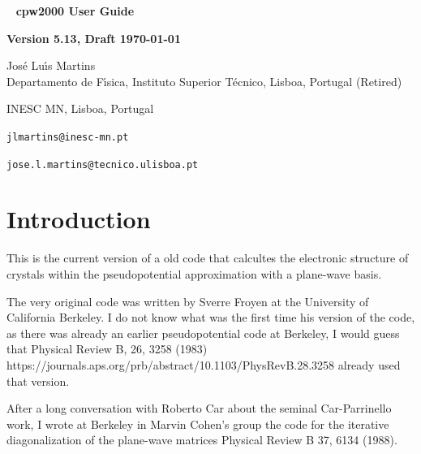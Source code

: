 \documentclass[11pt]{article}
\begin{document}

\begin{titlepage}

\begin{center}
~
\vfill
\vspace{1cm}
{\Huge {\bf cpw2000 User Guide}}
\par\vspace{3cm}
\hrulefill
\par\vspace{3cm}
{\Large {\bf Version 5.13, Draft \today}}
\par\vspace{2cm}
\hrulefill

{\Large Jos\'e Lu\'{\i}s Martins \\
Departamento de F\'{\i}sica, Instituto Superior T\'ecnico, Lisboa, Portugal (Retired)

INESC MN, Lisboa, Portugal

\texttt{jlmartins@inesc-mn.pt}

\texttt{jose.l.martins@tecnico.ulisboa.pt}
}
\vfill
\end{center}

\end{titlepage}

\tableofcontents
\newpage

\section{Introduction}
\label{sec:intro}

This is the current version of a old code that calcultes the electronic structure of crystals
within the pseudopotential approximation with a plane-wave basis.

The very original code was written by Sverre Froyen at the University of California Berkeley.
I do not know what was the first time his version of the code, as there was already an earlier
pseudopotential code at Berkeley, I would guess that
Physical Review B, 26, 3258 (1983) https://journals.aps.org/prb/abstract/10.1103/PhysRevB.28.3258
already used that version.

After a long conversation with Roberto Car about the seminal Car-Parrinello work, I wrote at Berkeley
in Marvin Cohen's group the
code for the iterative diagonalization of the plane-wave matrices
Physical Review B 37, 6134 (1988).
\end{document}

